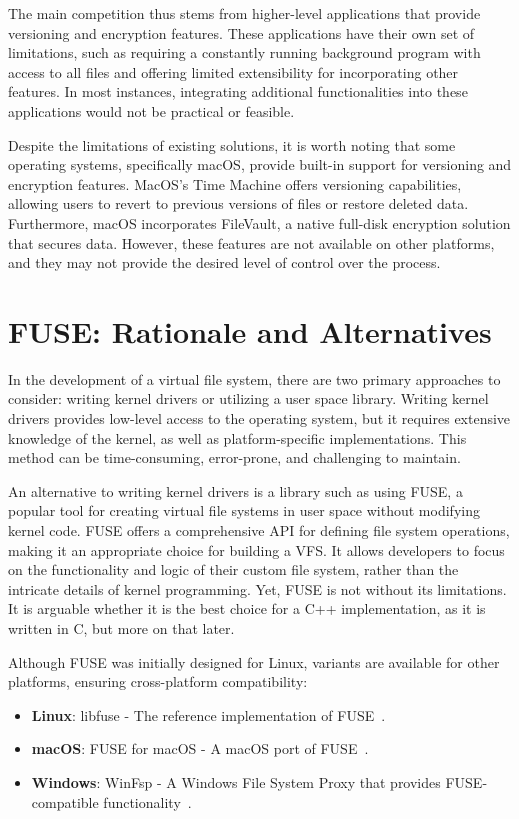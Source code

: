 The main competition thus stems from higher-level applications that provide versioning and encryption features.
These applications have their own set of limitations, such as requiring a constantly running background program with access to all files and offering limited extensibility for incorporating other features.
In most instances, integrating additional functionalities into these applications would not be practical or feasible.

Despite the limitations of existing solutions, it is worth noting that some operating systems, specifically macOS, provide built-in support for versioning and encryption features.
MacOS's Time Machine offers versioning capabilities, allowing users to revert to previous versions of files or restore deleted data.
Furthermore, macOS incorporates FileVault, a native full-disk encryption solution that secures data.
However, these features are not available on other platforms, and they may not provide the desired level of control over the process.

\section{FUSE: Rationale and Alternatives}\label{sec:fuse-analysis}

In the development of a virtual file system, there are two primary approaches to consider: writing kernel drivers or utilizing a user space library.
Writing kernel drivers provides low-level access to the operating system, but it requires extensive knowledge of the kernel, as well as platform-specific implementations.
This method can be time-consuming, error-prone, and challenging to maintain.

An alternative to writing kernel drivers is a library such as using FUSE, a popular tool for creating virtual file systems in user space without modifying kernel code.
FUSE offers a comprehensive API for defining file system operations, making it an appropriate choice for building a VFS.
It allows developers to focus on the functionality and logic of their custom file system, rather than the intricate details of kernel programming.
Yet, FUSE is not without its limitations.
It is arguable whether it is the best choice for a C++ implementation, as it is written in C, but more on that later.

Although FUSE was initially designed for Linux, variants are available for other platforms, ensuring cross-platform compatibility:

\begin{itemize}
    \item \textbf{Linux}: libfuse - The reference implementation of FUSE~\cite{libfuse}.
    \item \textbf{macOS}: FUSE for macOS - A macOS port of FUSE~\cite{osxfuse}.
    \item \textbf{Windows}: WinFsp - A Windows File System Proxy that provides FUSE-compatible functionality~\cite{winfsp}.
\end{itemize}

